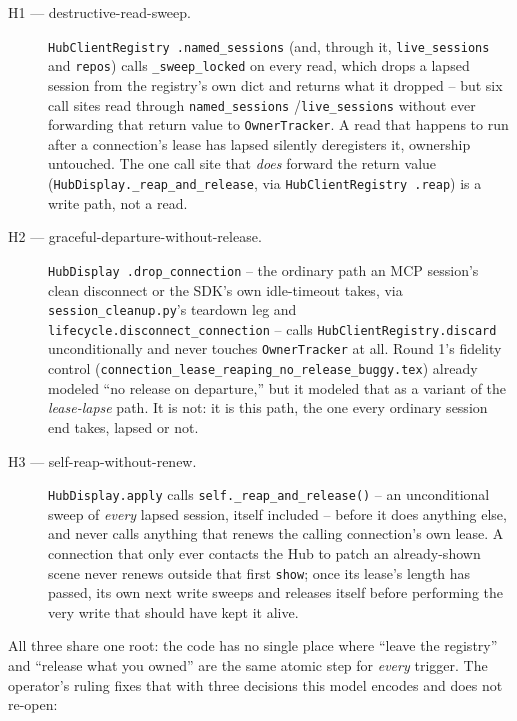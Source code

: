 \documentclass[a4paper,10pt,fleqn]{article}
\begin{document}
\begin{description}
  \item[H1 --- destructive-read-sweep.] \texttt{HubClientRegistry
    .named\_sessions} (and, through it, \texttt{live\_sessions} and
    \texttt{repos}) calls \texttt{\_sweep\_locked} on every read, which
    drops a lapsed session from the registry's own dict and returns what
    it dropped -- but six call sites read through \texttt{named\_sessions}
    /\texttt{live\_sessions} without ever forwarding that return value to
    \texttt{OwnerTracker}. A read that happens to run after a connection's
    lease has lapsed silently deregisters it, ownership untouched. The one
    call site that \emph{does} forward the return value
    (\texttt{HubDisplay.\_reap\_and\_release}, via \texttt{HubClientRegistry
    .reap}) is a write path, not a read.
  \item[H2 --- graceful-departure-without-release.] \texttt{HubDisplay
    .drop\_connection} -- the ordinary path an MCP session's clean
    disconnect or the SDK's own idle-timeout takes, via
    \texttt{session\_cleanup.py}'s teardown leg and
    \texttt{lifecycle.disconnect\_connection} -- calls
    \texttt{HubClientRegistry.discard} unconditionally and never touches
    \texttt{OwnerTracker} at all. Round 1's fidelity control
    (\texttt{connection\_lease\_reaping\_no\_release\_buggy.tex}) already
    modeled ``no release on departure,'' but it modeled that as a variant
    of the \emph{lease-lapse} path. It is not: it is this path, the one
    every ordinary session end takes, lapsed or not.
  \item[H3 --- self-reap-without-renew.] \texttt{HubDisplay.apply} calls
    \texttt{self.\_reap\_and\_release()} -- an unconditional sweep of
    \emph{every} lapsed session, itself included -- before it does
    anything else, and never calls anything that renews the calling
    connection's own lease. A connection that only ever contacts the Hub
    to patch an already-shown scene never renews outside that first
    \texttt{show}; once its lease's length has passed, its own next write
    sweeps and releases itself before performing the very write that
    should have kept it alive.
\end{description}

All three share one root: the code has no single place where ``leave the
registry'' and ``release what you owned'' are the same atomic step for
\emph{every} trigger. The operator's ruling fixes that with three
decisions this model encodes and does not re-open:
\end{document}
